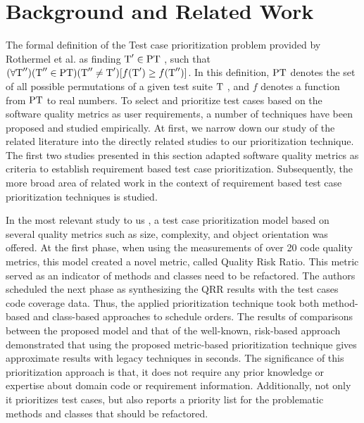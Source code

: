 \documentclass{sig-alternate}
\begin{document}
\section{Background and Related Work}
The formal definition of the Test case prioritization problem provided by Rothermel et al. \cite{rothermel:empirical} as finding $\textnormal{T}'\in  \textnormal{PT}$ , such that $(\forall \textnormal{T}'')(\textnormal{T}'' \in \textnormal{PT} )(\textnormal{T}'' \neq \textnormal{T}')[f(\textnormal{T}') \geq f(\textnormal{T}'')]$. In this definition, $\textnormal{PT}$ denotes the set of all possible permutations of a given test suite $\textnormal{T}$ , and $f$ denotes a function from $\textnormal{PT}$ to real numbers.
To select and prioritize test cases based on the software quality metrics as user requirements, a number of techniques have been proposed and studied empirically. At first, we narrow down our study of the related literature into the directly related studies to our prioritization technique. The first two studies presented in this section adapted software quality metrics as criteria to establish requirement based test case prioritization.  Subsequently, the more broad area of related work in the context of requirement based test case prioritization techniques is studied.

In the most relevant study to us \cite{ozturk:quality}, a test case prioritization model based on several quality metrics such as size, complexity, and object orientation was offered. At the first phase, when using the measurements of over 20 code quality metrics, this model created a novel metric, called Quality Risk Ratio. This metric served as an indicator of methods and classes need to be refactored. The authors scheduled the next phase as synthesizing the QRR results with the test cases\textsc{} code coverage data. Thus, the applied prioritization technique took both method-based and class-based approaches to schedule orders. The results of comparisons between the proposed model and that of the well-known, risk-based approach demonstrated that using the proposed metric-based prioritization technique gives approximate results with legacy techniques in seconds. The significance of this prioritization approach is that, it does not require any prior knowledge or expertise about domain code or requirement information. Additionally, not only it prioritizes test cases, but also reports a priority list for the problematic methods and classes that should be refactored. 
\end{document}
